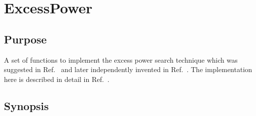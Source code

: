 \documentclass{article}
\begin{document}
\section{ExcessPower}

\subsection{Purpose}

A set of functions to implement the excess power search
technique which was suggested in Ref.~\cite{fh:1998} and
later independently invented in Ref.~\cite{acdhp:1999}.  The implementation
here is described in detail in Ref.~\cite{abcf:2000}. 



 
\subsection{Synopsis}

\end{document}
